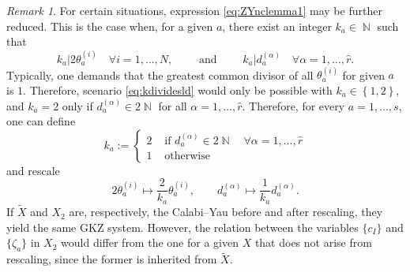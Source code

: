 \documentclass[12pt,a4paper,oneside]{amsart}
\numberwithin{equation}{section}
\theoremstyle{definition}
\theoremstyle{remark}
\newtheorem{rmk}[thm]{Remark}
\DeclareMathOperator{\N}{\mathbb{N}}
\begin{document}
\begin{rmk}\label{rem:divide2}
    For certain situations, expression \eqref{eq:ZYnclemma1} may be further reduced. This is the case when, for a given $a$, there exist an integer $k_a \in \N$ such that 
\begin{equation}
\label{eq:kdividesld}
	k_a \vert 2\theta_a^{(i)} \quad \forall i =1, \dots, N , \qquad \text{ and } \qquad k_a \vert d_a^{(\alpha)} \quad \forall \alpha=1, \dots, \hat{r} .
\end{equation}
Typically, one demands that the greatest common divisor of all $\theta_a ^{(i)}$ for given $a$ is $1$. Therefore, scenario \eqref{eq:kdividesld} would only be possible with $k_a \in \left\{1,2\right\} $, and $k_a=2$ only if $d_a^{(\alpha)} \in 2 \N$ for all $\alpha =1, \dots, \hat{r}$. Therefore, for every $a=1, \dots, s$, one can define
	\begin{equation*}
		k_a := \begin{cases} 2 & \text{ if } d_a^{(\alpha)} \in 2 \N \quad \forall \alpha=1, \dots, \hat{r} \\ 1 & \text{ otherwise} \end{cases}
	\end{equation*}
    and rescale 
    \begin{equation*}
        2 \theta^{(i)}_a \mapsto \frac{2}{k_a} \theta^{(i)}_a , \qquad d^{(\alpha)}_a \mapsto \frac{1}{k_a} d^{(\alpha)}_a .
    \end{equation*}
    If $\widetilde{X}$ and $X_2$ are, respectively, the Calabi--Yau before and after rescaling, they yield the same GKZ system. However, the relation between the variables $\{c_I\}$ and $\{\zeta_a\}$ in $X_2$ would differ from the one for a given $X$ that does not arise from rescaling, since the former is inherited from $\widetilde{X}$.
\end{rmk}
\end{document}
